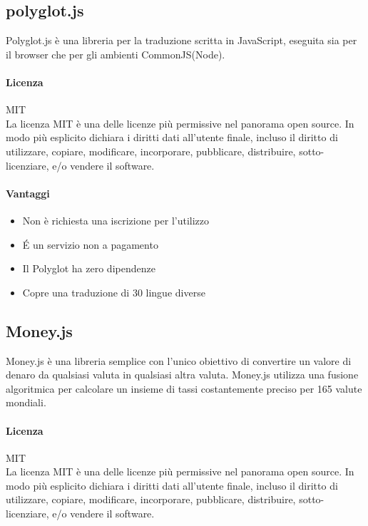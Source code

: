 \subsection{polyglot.js}
Polyglot.js è una libreria per la traduzione scritta in JavaScript, eseguita sia per il browser che per gli ambienti CommonJS(Node).

\paragraph{Licenza} MIT \\
La licenza MIT è una delle licenze più permissive nel panorama open
source. In modo più esplicito dichiara i diritti dati all'utente
finale, incluso il diritto di utilizzare, copiare, modificare,
incorporare, pubblicare, distribuire, sotto-licenziare, e/o vendere il
software. \\

\paragraph{Vantaggi}
\begin{itemize}
	\item Non è richiesta una iscrizione per l'utilizzo
	\item \'E un servizio non a pagamento
	\item Il Polyglot ha zero dipendenze
	\item Copre una traduzione di 30 lingue diverse
\end{itemize}




\subsection{Money.js}

Money.js è una libreria semplice con l'unico obiettivo di convertire
un valore di denaro da qualsiasi valuta in qualsiasi altra
valuta. Money.js utilizza una fusione algoritmica per calcolare un
insieme di tassi costantemente preciso per 165 valute mondiali. 
 \\

\paragraph{Licenza} MIT \\
La licenza MIT è una delle licenze più permissive nel panorama open
source. In modo più esplicito dichiara i diritti dati all'utente
finale, incluso il diritto di utilizzare, copiare, modificare,
incorporare, pubblicare, distribuire, sotto-licenziare, e/o vendere il
software.\\ 

